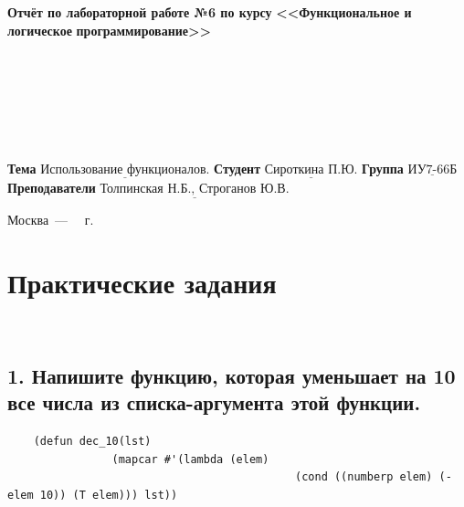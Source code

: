\documentclass[12pt]{report}
\begin{document}
\begin{titlepage}
	
	\begin{center}
		\noindent\begin{minipage}{1.3\textwidth}\centering
			\Large\textbf{  Отчёт по лабораторной работе №6 по курсу}\newline\newline
			\textbf{<<Функциональное и логическое}\newline
			\textbf{\indent\indent\indent программирование>>}\newline
		\end{minipage}
	\end{center}
	
	~\\\\\\\\\\\\
	\large
	\noindent\textbf{Тема } $\underline{\text{Использование функционалов.}}$\newline\newline
	\noindent\textbf{Студент } $\underline{\text{Сироткина П.Ю.}}$\newline\newline
	\noindent\textbf{Группа } $\underline{\text{ИУ7-66Б}}$\newline\newline
	\noindent\textbf{Преподаватели } $\underline{\text{Толпинская Н.Б., Строганов Ю.В.}}$\newline\newline\newline
	
	\begin{center}
		\vfill
		Москва~---~\the\year
		~г.
	\end{center}
\end{titlepage}

\chapter*{Практические задания}

~\

\section*{1. Напишите функцию, которая уменьшает на 10 все числа из списка-аргумента этой функции.}

\begin{lstlisting}
	(defun dec_10(lst) 
				(mapcar #'(lambda (elem) 
											(cond ((numberp elem) (- elem 10)) (T elem))) lst))
\end{lstlisting}
\end{document}
